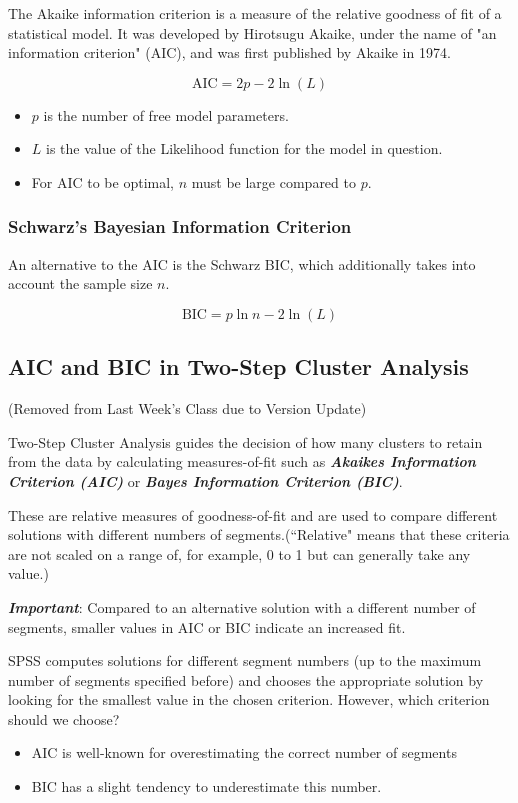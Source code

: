 \documentclass[a4paper,12pt]{article}
\begin{document}
The Akaike information criterion is a measure of the relative goodness of fit of a statistical model. It was developed by Hirotsugu Akaike, under the name of "an information criterion" (AIC), and was first published by Akaike in 1974.
\bigskip

\[\mbox{AIC} = 2p - 2\ln(L)\]

\begin{itemize}
\item $p$ is the number of free model parameters.
\item $L$ is the value of the Likelihood function for the model in question.
\item For AIC to be optimal, $n$ must be large compared to $p$.\\
\end{itemize}
\subsubsection{Schwarz's Bayesian Information Criterion}
An alternative to the AIC is the Schwarz BIC, which additionally takes into account the sample size $n$.

\[\mbox{BIC} = p\ln{n} - 2\ln(L)\]


\subsection{AIC and BIC in Two-Step Cluster Analysis}

(Removed from Last Week's Class due to Version Update)

Two-Step Cluster Analysis guides the decision of how many clusters to retain from the data by
calculating measures-of-fit such as \textbf{\textit{Akaikes Information Criterion (AIC)}} or \textbf{\textit{Bayes Information Criterion (BIC)}}.

These are relative measures of goodness-of-fit and are used to compare different
solutions with different numbers of segments.(``Relative" means that these criteria
are not scaled on a range of, for example, 0 to 1 but can generally take any value.)


\textbf{\textit{Important}}: Compared to an alternative solution with a different number of segments, smaller
values in AIC or BIC indicate an increased fit.

SPSS computes solutions for different segment numbers (up to the maximum number of segments specified before) and
chooses the appropriate solution by looking for the smallest value in the chosen
criterion. However, which criterion should we choose?
\begin{itemize}
\item AIC is well-known for
overestimating the correct number of segments
\item BIC has a slight tendency
to underestimate this number.
\end{itemize}
\end{document}
